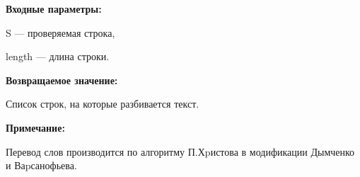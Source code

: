\textbf{Входные параметры:}

S --- проверяемая строка,

length ---  длина строки.

\textbf{Возвращаемое значение:}
 
Список строк, на которые разбивается текст.

\textbf{Примечание:}

Перевод слов производится по алгоритму П.Хpистова в модификации Дымченко и Ваpсанофьева.